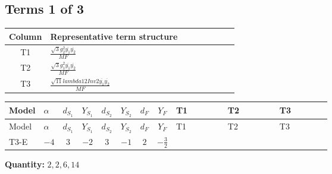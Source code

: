 \documentclass[8pt]{article}
\begin{document}
\begin{landscape}
\subsection*{Terms 1 of 3}
\begin{center}
\begin{tabular}{@{}c >{\raggedright\arraybackslash}p{0.82\linewidth}@{}}
\toprule
Column & Representative term structure \\
\midrule
T1 & \(\displaystyle \frac{\sqrt{3} g_{2}^{2} \overline{y_{1}} \overline{y_{2}}}{MF}\) \\
\midrule
T2 & \(\displaystyle \frac{\sqrt{3} g_{1}^{2} \overline{y_{1}} \overline{y_{2}}}{MF}\) \\
\midrule
T3 & \(\displaystyle \frac{\sqrt{11} lambda12Inv2 \overline{y_{1}} \overline{y_{2}}}{MF}\) \\
\midrule
\bottomrule
\end{tabular}
\end{center}
\smallskip
\tiny
\begin{longtable}{@{}llcccccc >{\raggedright\arraybackslash}p{0.21\linewidth} >{\raggedright\arraybackslash}p{0.21\linewidth} >{\raggedright\arraybackslash}p{0.21\linewidth}@{}}
\toprule
Model & $\alpha$ & $d_{S_1}$ & $Y_{S_1}$ & $d_{S_2}$ & $Y_{S_2}$ & $d_F$ & $Y_F$ & T1 & T2 & T3 \\
\midrule
\endfirsthead
\toprule
Model & $\alpha$ & $d_{S_1}$ & $Y_{S_1}$ & $d_{S_2}$ & $Y_{S_2}$ & $d_F$ & $Y_F$ & T1 & T2 & T3 \\
\midrule
\endhead
T3-E & $-4$ & $3$ & $-2$ & $3$ & $-1$ & $2$ & $-\frac{3}{2}$ & \scriptsize\adjustbox{max width=\linewidth}{$\begin{gathered} - \frac{49 \sqrt{3} g_{2}^{2} \overline{y_{1}} \overline{y_{2}}}{24 MF}\end{gathered}$} & \scriptsize\adjustbox{max width=\linewidth}{$\begin{gathered} - \frac{9 \sqrt{3} g_{1}^{2} \overline{y_{1}} \overline{y_{2}}}{8 MF}\end{gathered}$} & \scriptsize\adjustbox{max width=\linewidth}{$\begin{gathered} - \frac{3 \sqrt{11} lambda12Inv2 \overline{y_{1}} \overline{y_{2}}}{22 MF}\end{gathered}$} \\
\midrule
\bottomrule
\end{longtable}
\clearpage
\noindent\textbf{Quantity: }$\mathrm{2,2,6,14}$\par\smallskip

\end{landscape}
\end{document}
